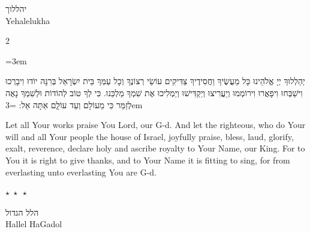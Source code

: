 \documentclass[11pt, openany]{book}
\newcommand{\sederdivider}{%
  \par\vspace{6pt}
  \begin{center}
    \textcolor{sedergold}{\large$\star\;\star\;\star$}
  \end{center}
  \par\vspace{6pt}
}
\newenvironment{bilingual}{%
  \par\vspace{4pt}%
  \begin{paracol}{2}%
}{%
  \end{paracol}%
  \par\vspace{2pt}%
}
\newenvironment{hebrewcol}{%
  \switchcolumn[1]%
  \begingroup
  \RTL
  \hebrewfont\large
  \setstretch{1.4}%
  \emergencystretch=3em
  \tolerance=9999
  \parindent=0pt\relax
}{%
  \endRTL
  \endgroup
}
\newenvironment{englishcol}{%
  \switchcolumn[0]%
  \begingroup
  \setstretch{1.4}%
  \emergencystretch=3em
  \tolerance=9999
  \normalsize
  \rightskip=0.12in\relax
}{%
  \endgroup
}
\newcommand{\subsedertitle}[2]{%
  \par\vspace{8pt}
  \begin{center}
    {\kidssteptitlefonthebrew\textcolor{sederblue}{\beginR #1\endR}}\\[3pt]
    {\kidssteptitlefont\normalsize\textcolor{sederblue}{#2}}
  \end{center}
  \par\vspace{3pt}
}
\begin{document}
\subsedertitle{יהללוך}{Yehalelukha}

\begin{bilingual}
\begin{hebrewcol}
יְהַלְלוּךָ יְיָ אֱלֹהֵינוּ כָּל מַעֲשֶׂיךָ וַחֲסִידֶיךָ צַדִּיקִים עוֹשֵׂי רְצוֹנֶךָ וְכָל עַמְּךָ בֵּית יִשְׂרָאֵל בְּרִנָּה יוֹדוּ וִיבָרְכוּ וִישַׁבְּחוּ וִיפָאֲרוּ וִירוֹמְמוּ וְיַעֲרִיצוּ וְיַקְדִּישׁוּ וְיַמְלִיכוּ אֶת שִׁמְךָ מַלְכֵּנוּ. כִּי לְךָ טוֹב לְהוֹדוֹת וּלְשִׁמְךָ נָאֶה לְזַמֵּר כִּי מֵעוֹלָם וְעַד עוֹלְָם אַתָּה אֵל:
\end{hebrewcol}
\begin{englishcol}
Let all Your works praise You Lord, our G-d. And let the righteous, who do Your will and all Your people the house of Israel, joyfully praise, bless, laud, glorify, exalt, reverence, declare holy and ascribe royalty to Your Name, our King. For to You it is right to give thanks, and to Your Name it is fitting to sing, for from everlasting unto everlasting You are G-d.
\end{englishcol}
\end{bilingual}
\sederdivider

\subsedertitle{הלל הגדול}{Hallel HaGadol}
\end{document}
